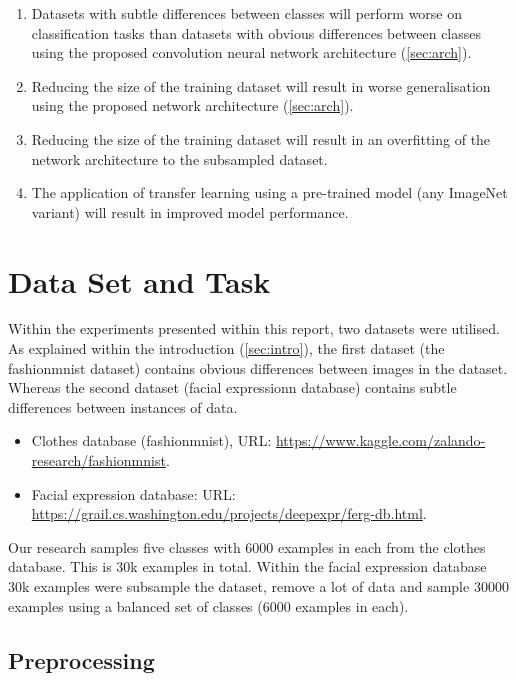 \documentclass{article}
\begin{document}
\begin{enumerate}[label=\textbf{H.\arabic*}]
  \item \label{h:1} Datasets with subtle differences between classes will perform worse on classification tasks than datasets with obvious differences between classes using the proposed convolution neural network architecture (\ref{sec:arch}).
  \item \label{h:2} Reducing the size of the training dataset will result in worse generalisation using the proposed network architecture (\ref{sec:arch}).
  \item \label{h:3} Reducing the size of the training dataset will result in an overfitting of the network architecture to the subsampled dataset.
  \item \label{h:4} The application of transfer learning using a pre-trained model (any ImageNet variant) will result in improved model performance.
\end{enumerate}

\section{Data Set and Task}
\label{sec:data}

Within the experiments presented within this report, two datasets were utilised. As explained within the introduction (\ref{sec:intro}), the first dataset (the fashionmnist dataset) contains obvious differences between images in the dataset. Whereas the second dataset (facial expressionn database) contains subtle differences between instances of data.

\begin{itemize}
  \item Clothes database (fashionmnist), URL: \url{https://www.kaggle.com/zalando-research/fashionmnist}. 
  \item Facial expression database: URL: \url{https://grail.cs.washington.edu/projects/deepexpr/ferg-db.html}.
\end{itemize}

Our research samples five classes with 6000 examples in each from the clothes database. This is 30k examples in total. Within the facial expression database 30k examples were  subsample the dataset, remove a lot of data and sample 30000 examples using a balanced set of classes (6000 examples in each).

\subsection{Preprocessing}
\label{sec:preprocessing}
\end{document}
